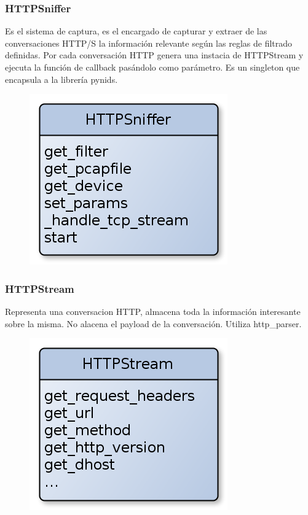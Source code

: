 \subsubsection{HTTPSniffer}

Es el sistema de captura, es el encargado de capturar y extraer de las conversaciones HTTP/S la información relevante según las reglas de filtrado definidas. Por cada conversación HTTP genera una instacia de HTTPStream y ejecuta la función de callback pasándolo como parámetro. Es un singleton que encapsula a la librería pynids.

\begin{figure}[hbtp]
    \centering
	\includegraphics[scale=0.40]{img/HTTPSniffer.png} 
\end{figure}

\subsubsection{HTTPStream}

Representa una conversacion HTTP, almacena toda la información interesante sobre la misma. No alacena el payload de la conversación. Utiliza http\_parser.

\begin{figure}[hbtp]
    \centering
	\includegraphics[scale=0.40]{img/HTTPStream.png} 
\end{figure}

